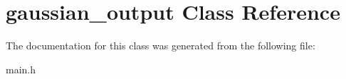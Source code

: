 \hypertarget{classgaussian__output}{
\section{gaussian\_\-output Class Reference}
\label{classgaussian__output}
}


The documentation for this class was generated from the following file:\begin{DoxyCompactItemize}
\item 
main.h\end{DoxyCompactItemize}
